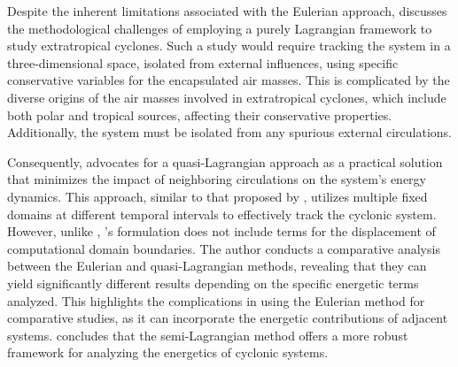 Despite the inherent limitations associated with the Eulerian approach, \citet{michaelides1999quasi} discusses the methodological challenges of employing a purely Lagrangian framework to study extratropical cyclones. Such a study would require tracking the system in a three-dimensional space, isolated from external influences, using specific conservative variables for the encapsulated air masses. This is complicated by the diverse origins of the air masses involved in extratropical cyclones, which include both polar and tropical sources, affecting their conservative properties. Additionally, the system must be isolated from any spurious external circulations.

Consequently, \citet{michaelides1999quasi} advocates for a quasi-Lagrangian approach as a practical solution that minimizes the impact of neighboring circulations on the system's energy dynamics. This approach, similar to that proposed by \citet{vincent1973some}, utilizes multiple fixed domains at different temporal intervals to effectively track the cyclonic system. However, unlike \citet{vincent1973some}, \citet{michaelides1999quasi}'s formulation does not include terms for the displacement of computational domain boundaries. The author conducts a comparative analysis between the Eulerian and quasi-Lagrangian methods, revealing that they can yield significantly different results depending on the specific energetic terms analyzed. This highlights the complications in using the Eulerian method for comparative studies, as it can incorporate the energetic contributions of adjacent systems. \citet{michaelides1999quasi} concludes that the semi-Lagrangian method offers a more robust framework for analyzing the energetics of cyclonic systems.

